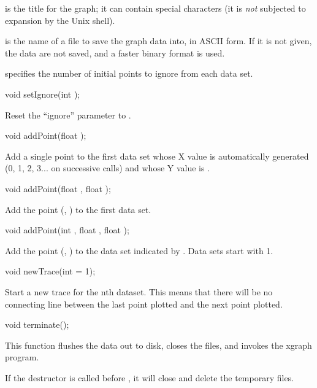  is the title for the graph; it can contain special
characters (it is \emph{not} subjected to expansion by the Unix shell).

 is the name of a file to save the graph data into, in
ASCII form.  If it is not given, the data are not saved, and a faster
binary format is used.

 specifies the number of initial points to ignore from
each data set.

\begin{example}
void setIgnore(int );
\end{example}

Reset the ``ignore'' parameter to .

\begin{example}
void addPoint(float );
\end{example}

Add a single point to the first data set whose X value is
automatically generated (0, 1, 2, 3... on successive calls)
and whose Y value is .

\begin{example}
void addPoint(float , float );
\end{example}

Add the point (, ) to the first data set.

\begin{example}
void addPoint(int , float , float );
\end{example}

Add the point (, ) to the data set indicated by
.  Data sets start with 1.

\begin{example}
void newTrace(int  = 1);
\end{example}

Start a new trace for the nth dataset.  This means that there will be
no connecting line between the last point plotted and the next point
plotted.

\begin{example}
void terminate();
\end{example}

This function flushes the data out to disk, closes the files, and
invokes the xgraph program.

If the destructor is called before , it will close and
delete the temporary files.

